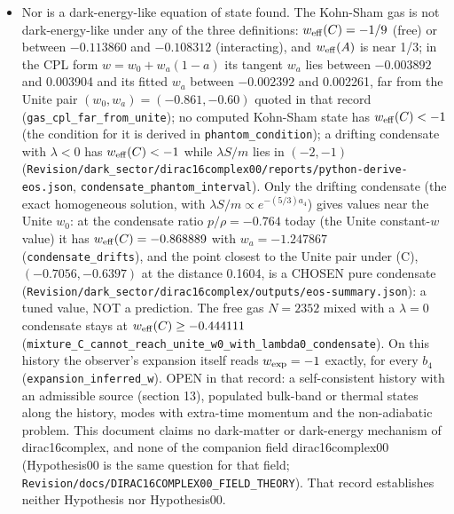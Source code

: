\documentclass[11pt]{article}
\begin{document}
\begin{itemize}
\item Nor is a dark-energy-like equation of state found. The Kohn-Sham gas is not dark-energy-like under any of the three definitions: $w_{\rm eff}(C) = -1/9$ (free) or between $-0.113860$ and $-0.108312$ (interacting), and $w_{\rm eff}(A)$ is near 1/3; in the CPL form $w = w_0 + w_a(1 - a)$ its tangent $w_a$ lies between $-0.003892$ and 0.003904 and its fitted $w_a$ between $-0.002392$ and 0.002261, far from the Unite pair $(w_0, w_a) = (-0.861, -0.60)$ quoted in that record (\texttt{gas\_cpl\_\allowbreak{}far\_from\allowbreak{}\_unite}); no computed Kohn-Sham state has $w_{\rm eff}(C) < -1$ (the condition for it is derived in \texttt{phantom\_\allowbreak{}conditio\allowbreak{}n}); a drifting condensate with $\lambda < 0$ has $w_{\rm eff}(C) < -1$ while $\lambda S/m$ lies in $(-2, -1)$ (\texttt{Revision\allowbreak{}/dark\_se\allowbreak{}ctor/dir\allowbreak{}ac16comp\allowbreak{}lex00/re\allowbreak{}ports/py\allowbreak{}thon-der\allowbreak{}ive-eos.\allowbreak{}json}, \texttt{condensa\allowbreak{}te\_phant\allowbreak{}om\_inter\allowbreak{}val}). Only the drifting condensate (the exact homogeneous solution, with $\lambda S/m \propto e^{-(5/3)a_4}$) gives values near the Unite $w_0$: at the condensate ratio $p/\rho = -0.764$ today (the Unite constant-$w$ value) it has $w_{\rm eff}(C) = -0.868889$ with $w_a = -1.247867$ (\texttt{condensa\allowbreak{}te\_drift\allowbreak{}s}), and the point closest to the Unite pair under (C), $(-0.7056, -0.6397)$ at the distance 0.1604, is a CHOSEN pure condensate (\texttt{Revision\allowbreak{}/dark\_se\allowbreak{}ctor/dir\allowbreak{}ac16comp\allowbreak{}lex/outp\allowbreak{}uts/eos-\allowbreak{}summary.\allowbreak{}json}): a tuned value, NOT a prediction. The free gas $N = 2352$ mixed with a $\lambda = 0$ condensate stays at $w_{\rm eff}(C) \geq -0.444111$ (\texttt{mixture\_\allowbreak{}C\_cannot\allowbreak{}\_reach\_u\allowbreak{}nite\_w0\_\allowbreak{}with\_lam\allowbreak{}bda0\_con\allowbreak{}densate}). On this history the observer's expansion itself reads $w_{\rm exp} = -1$ exactly, for every $b_4$ (\texttt{expansio\allowbreak{}n\_inferr\allowbreak{}ed\_w}). OPEN in that record: a self-consistent history with an admissible source (section 13), populated bulk-band or thermal states along the history, modes with extra-time momentum and the non-adiabatic problem. This document claims no dark-matter or dark-energy mechanism of dirac16complex, and none of the companion field dirac16complex00 (Hypothesis00 is the same question for that field; \texttt{Revision\allowbreak{}/docs/DI\allowbreak{}RAC16COM\allowbreak{}PLEX00\_F\allowbreak{}IELD\_THE\allowbreak{}ORY}). That record establishes neither Hypothesis nor Hypothesis00.

\end{itemize}
\end{document}
